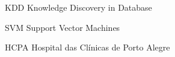 \documentclass[
	12pt,				%
	a4paper,			%
        ec,         %
        pgii,       %
	english,			%
	brazil				%
	]{C3FURG}
\begin{document}

\frenchspacing 


\imprimircapa

\imprimirfolhaderosto






\listoffigures*
\cleardoublepage

\listoftables*
\cleardoublepage

\begin{siglas}
  \item[KDD] Knowledge Discovery in Database
  \item[SVM] Support Vector Machines
  \item[HCPA] Hospital das Clínicas de Porto Alegre
\end{siglas}


\tableofcontents*
\cleardoublepage














\end{document}
